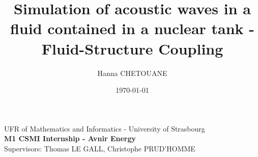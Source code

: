 \documentclass{beamer}
\author[Avnir Energy]{Hanna CHETOUANE \\ \vspace{-0.8cm} \date{\today}}
\title[Fluid-Structure Coupling]{Simulation of acoustic waves in a fluid contained in a nuclear tank - Fluid-Structure Coupling}
\begin{document}
\begin{frame}
    \titlepage
    \vspace{-0.4cm}
    \begin{center}
        UFR of Mathematics and Informatics - University of Strasbourg 
        \\[0.2cm] 
        \textbf{M1 CSMI Internship - Avnir Energy} \\[0.2cm]
        Supervisors: Thomas LE GALL, Christophe PRUD'HOMME
    \end{center}
\end{frame} 
\end{document}

